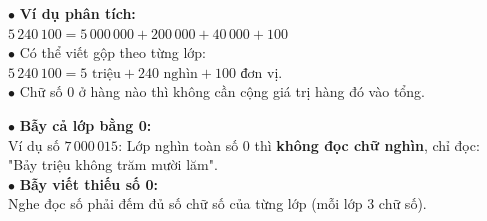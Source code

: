 \documentclass[14pt,a4paper,oneside]{extbook}
\begin{document}
\vspace{2.5mm}

\noindent
\begin{minipage}[t]{0.54\textwidth}
  \begin{tcolorbox}[
    enhanced,
    title={\footnotesize\bfseries\color{white}\faKey\ Phân tích số thành tổng các triệu, nghìn},
    colback=green!3!white,
    colframe=green!60!black,
    arc=2.5mm, boxrule=0.8pt, top=1.8mm, bottom=1.8mm, left=2.2mm, right=2.2mm
  ]
    \footnotesize
    $\bullet$ \textbf{Ví dụ phân tích:}\\
    $5\,240\,100 = 5\,000\,000 + 200\,000 + 40\,000 + 100$\\
    $\bullet$ Có thể viết gộp theo từng lớp:\\
    $5\,240\,100 = 5\text{ triệu} + 240\text{ nghìn} + 100\text{ đơn vị}$.\\
    $\bullet$ Chữ số 0 ở hàng nào thì không cần cộng giá trị hàng đó vào tổng.
  \end{tcolorbox}
\end{minipage}%
\hfill
\begin{minipage}[t]{0.44\textwidth}
  \begin{tcolorbox}[
    enhanced,
    title={\footnotesize\bfseries\color{white}\faExclamationTriangle\ Mẹo tránh bẫy trắc nghiệm},
    colback=red!2!white,
    colframe=red!70!black,
    arc=2.5mm, boxrule=0.8pt, top=1.8mm, bottom=1.8mm, left=2.2mm, right=2.2mm
  ]
    \footnotesize
    $\bullet$ \textbf{Bẫy cả lớp bằng 0:}\\
    Ví dụ số $7\,000\,015$: Lớp nghìn toàn số 0 thì \textbf{không đọc chữ nghìn}, chỉ đọc: "Bảy triệu không trăm mười lăm".\\
    $\bullet$ \textbf{Bẫy viết thiếu số 0:}\\
    Nghe đọc số phải đếm đủ số chữ số của từng lớp (mỗi lớp 3 chữ số).
  \end{tcolorbox}
\end{minipage}
\end{document}
